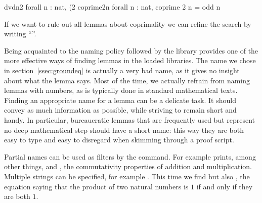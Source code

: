 \begin{coqout}{}{}
dvdn2  forall n : nat, (2 %
coprime2n  forall n : nat, coprime 2 n = odd n
\end{coqout}
If we want to rule out all lemmas about coprimality we can refine the
search by writing ``''.


Being acquainted to the naming policy followed by the \mcbMC{} library
provides one of the more effective ways of finding lemmas in the
loaded libraries. The name   we chose in
section~\ref{ssec:groundeq} is actually a very bad name, as it gives no
insight about what the lemma says. Most of the time, we actually
refrain  from naming lemmas with numbers, as is typically done in
standard mathematical texts. Finding an appropriate name for a
lemma can be a delicate task. It should convey as much information as
possible, while striving to remain short and handy. In particular,
bureaucratic lemmas that are frequently used but represent no deep
mathematical step should have a short name: this way they are both
easy to type and easy to disregard when skimming through a proof
script.

Partial names can be used as filters by the  command. For example
 prints, among other things,  and ,
the commutativity properties of addition and multiplication.  Multiple
strings can be specified, for example .  This time
we find  but also , the equation saying that
the product of two natural numbers is $1$ if and only if they are both $1$.

